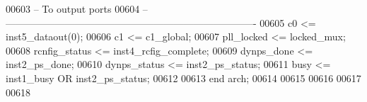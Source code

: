 \begin{DoxyCode}
00603 \textcolor{keyword}{-- To output ports}
00604 \textcolor{keyword}{-- ----------------------------------------------------------------------------}
00605 \textcolor{vhdlchar}{c0}             \textcolor{vhdlchar}{<=} \textcolor{vhdlchar}{inst5_dataout}\textcolor{vhdlchar}{(}\textcolor{vhdllogic}{}\textcolor{vhdllogic}{0}\textcolor{vhdlchar}{)};
00606 \textcolor{vhdlchar}{c1}             \textcolor{vhdlchar}{<=} \textcolor{vhdlchar}{c1_global};
00607 \textcolor{vhdlchar}{pll_locked}     \textcolor{vhdlchar}{<=} \textcolor{vhdlchar}{locked_mux};
00608 \textcolor{vhdlchar}{rcnfig_status}  \textcolor{vhdlchar}{<=} \textcolor{vhdlchar}{inst4_rcfig_complete};
00609 \textcolor{vhdlchar}{dynps_done}     \textcolor{vhdlchar}{<=} \textcolor{vhdlchar}{inst2_ps_done};
00610 \textcolor{vhdlchar}{dynps_status}   \textcolor{vhdlchar}{<=} \textcolor{vhdlchar}{inst2_ps_status};
00611 \textcolor{vhdlchar}{busy}           \textcolor{vhdlchar}{<=} \textcolor{vhdlchar}{inst1_busy} \textcolor{keywordflow}{OR} \textcolor{vhdlchar}{inst2_ps_status};
00612   
00613 \textcolor{keywordflow}{end} \textcolor{vhdlchar}{arch};   
00614 
00615 
00616 
00617 
00618 
\end{DoxyCode}
